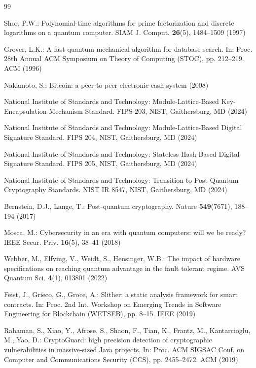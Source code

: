 \documentclass[runningheads]{llncs}
\begin{document}
\begin{thebibliography}{99}

Shor, P.W.: Polynomial-time algorithms for prime factorization and discrete
logarithms on a quantum computer. SIAM J. Comput. \textbf{26}(5), 1484--1509
(1997)

Grover, L.K.: A fast quantum mechanical algorithm for database search. In: Proc.
28th Annual ACM Symposium on Theory of Computing (STOC), pp. 212--219. ACM
(1996)

Nakamoto, S.: Bitcoin: a peer-to-peer electronic cash system (2008)

National Institute of Standards and Technology: Module-Lattice-Based
Key-Encapsulation Mechanism Standard. FIPS 203, NIST, Gaithersburg, MD (2024)

National Institute of Standards and Technology: Module-Lattice-Based Digital
Signature Standard. FIPS 204, NIST, Gaithersburg, MD (2024)

National Institute of Standards and Technology: Stateless Hash-Based Digital
Signature Standard. FIPS 205, NIST, Gaithersburg, MD (2024)

National Institute of Standards and Technology: Transition to Post-Quantum
Cryptography Standards. NIST IR 8547, NIST, Gaithersburg, MD (2024)

Bernstein, D.J., Lange, T.: Post-quantum cryptography. Nature
\textbf{549}(7671), 188--194 (2017)

Mosca, M.: Cybersecurity in an era with quantum computers: will we be ready?
IEEE Secur. Priv. \textbf{16}(5), 38--41 (2018)

Webber, M., Elfving, V., Weidt, S., Hensinger, W.B.: The impact of hardware
specifications on reaching quantum advantage in the fault tolerant regime. AVS
Quantum Sci. \textbf{4}(1), 013801 (2022)

Feist, J., Grieco, G., Groce, A.: Slither: a static analysis framework for smart
contracts. In: Proc. 2nd Int. Workshop on Emerging Trends in Software
Engineering for Blockchain (WETSEB), pp. 8--15. IEEE (2019)

Rahaman, S., Xiao, Y., Afrose, S., Shaon, F., Tian, K., Frantz, M.,
Kantarcioglu, M., Yao, D.: CryptoGuard: high precision detection of
cryptographic vulnerabilities in massive-sized Java projects. In: Proc. ACM
SIGSAC Conf. on Computer and Communications Security (CCS), pp. 2455--2472. ACM
(2019)


\end{thebibliography}
\end{document}
